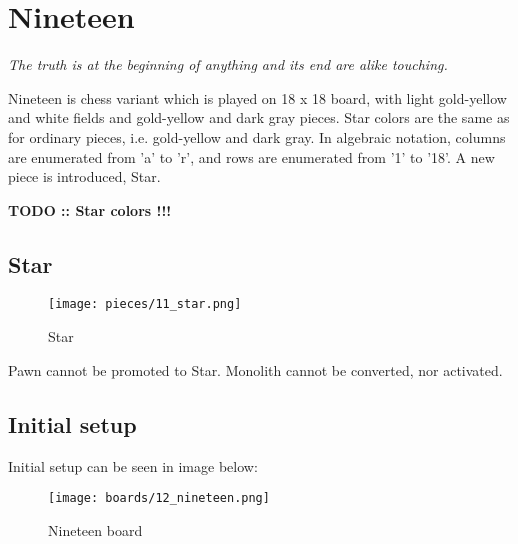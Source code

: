 
\chapter*{Nineteen}

\begin{flushright}
\parbox{0.8\textwidth}{
\emph{The truth is at the beginning of anything and its end are alike touching. \\
 } }
\end{flushright}

\noindent
Nineteen is chess variant which is played on 18 x 18 board, with
light gold-yellow and white fields and gold-yellow and dark gray
pieces. Star colors are the same as for ordinary pieces, i.e.
gold-yellow and dark gray. In algebraic notation, columns are
enumerated from 'a' to 'r', and rows are enumerated from '1' to '18'.
A new piece is introduced, Star.

\textbf{\huge{TODO :: Star colors !!!}} %

\clearpage %

\section*{Star}

\noindent
\begin{wrapfigure}{l}{0.4\textwidth}
\centering
\texttt{[image: pieces/11\_star.png]}
\caption{Star}
\label{fig:11_star}
\end{wrapfigure}

Pawn cannot be promoted to Star.
Monolith cannot be converted, nor activated.

\clearpage %

\section*{Initial setup}

Initial setup can be seen in image below:

\noindent
\begin{figure}[h]
\texttt{[image: boards/12\_nineteen.png]}
\caption{Nineteen board}
\label{fig:12_nineteen}
\end{figure}

\clearpage %
